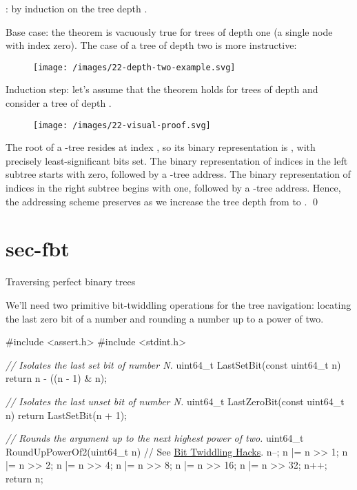\documentclass{article}
\begin{document}
: by induction on the tree depth .

Base case: the theorem is vacuously true for trees of depth one (a single node with index zero).
The case of a tree of depth two is more instructive:

\begin{figure}[grayscale-diagram]
  \texttt{[image: /images/22-depth-two-example.svg]}
\end{figure}

Induction step: let's assume that the theorem holds for trees of depth  and consider a tree of depth .

\begin{figure}[grayscale-diagram]
  \texttt{[image: /images/22-visual-proof.svg]}
\end{figure}

The root of a -tree resides at index , so its binary representation is , with precisely  least-significant bits set.
The binary representation of indices in the left subtree starts with zero, followed by a -tree address.
The binary representation of indices in the right subtree begins with one, followed by a -tree address.
Hence, the addressing scheme preserves as we increase the tree depth from  to .
\qed

\section{sec-fbt}{Traversing perfect binary trees}

We'll need two primitive bit-twiddling operations for the tree navigation: locating the last zero bit of a number and rounding a number up to a power of two.

\begin{code}[c]
#include <assert.h>
#include <stdint.h>

\emph{// Isolates the last set bit of number N.}
uint64_t LastSetBit(const uint64_t n) {
    return n - ((n - 1) & n);
}

\emph{// Isolates the last unset bit of number N.}
uint64_t LastZeroBit(const uint64_t n) {
    return LastSetBit(n + 1);
}

\emph{// Rounds the argument up to the next highest power of two.}
uint64_t RoundUpPowerOf2(uint64_t n) {
    // See \href{https://graphics.stanford.edu/~seander/bithacks.html#RoundUpPowerOf2}{Bit Twiddling Hacks}.
    n--;
    n |= n >> 1;
    n |= n >> 2;
    n |= n >> 4;
    n |= n >> 8;
    n |= n >> 16;
    n |= n >> 32;
    n++;
    return n;
}
\end{code}
\end{document}
